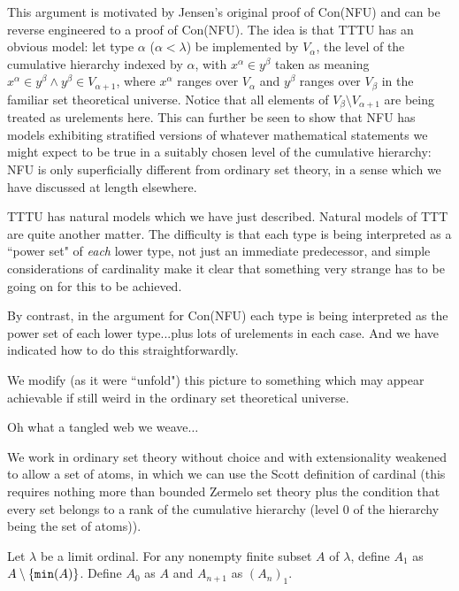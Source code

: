 \documentclass{slides}
\begin{document}
\begin{slide}

This argument is motivated by Jensen's original proof of Con(NFU) and can be reverse engineered to a proof of Con(NFU).  The idea is that TTTU has an obvious model:
let type $\alpha$ ($\alpha<\lambda$) be implemented by $V_\alpha$, the level of the cumulative hierarchy indexed by $\alpha$, with $x^\alpha \in y^\beta$ taken as
meaning $x^\alpha \in y^\beta \wedge y^\beta \in V_{\alpha+1}$, where $x^{\alpha}$ ranges over $V_\alpha$ and $y^{\beta}$ ranges over $V_{\beta}$ in the familiar set theoretical universe.  Notice that all elements of $V_{\beta} \setminus V_{\alpha+1}$ are being treated as urelements here.  This can further be seen to show that NFU has models exhibiting stratified versions of whatever mathematical statements we might expect to be true in a suitably chosen level of the cumulative hierarchy:  NFU is only superficially different from ordinary set theory, in a sense which we have discussed at length elsewhere.

\end{slide}

\begin{slide}

TTTU has natural models which we have just described.  Natural models of TTT are quite another matter.  The difficulty is that each type is being interpreted as a ``power set"
of {\em each\/} lower type, not just an immediate predecessor, and simple considerations of cardinality make it clear that something very strange has to be going on for this to be achieved.

By contrast, in the argument for Con(NFU) each type is being interpreted as the power set of each lower type...plus lots of urelements in each case.  And we have indicated how to do this straightforwardly.

We modify (as it were ``unfold") this picture to something which may appear achievable if still weird in the ordinary set theoretical universe.

\end{slide}

\begin{slide}

{\Large Oh what a tangled web we weave$\ldots$}

We work in ordinary set theory without choice and with extensionality weakened to allow a set of atoms, in which we can use the Scott definition of cardinal (this requires nothing more than bounded Zermelo set theory plus
the condition that every set belongs to a rank of the cumulative hierarchy (level 0 of the hierarchy being the set of atoms)).

Let $\lambda$ be a limit ordinal.  For any nonempty finite subset $A$ of $\lambda$, define $A_1$ as $A \setminus \{{\tt min}(A)\}$.   Define $A_0$ as $A$
and $A_{n+1}$ as $(A_n)_1$.

\end{slide}
\end{document}
